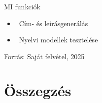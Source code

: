 \documentclass[11pt]{beamer}
\begin{document}
\begin{frame}{MI funkciók}
    \begin{center}
    \end{center}
    \begin{itemize}
      \item \faPen~Cím- és leírásgenerálás
      \item \faFlask~Nyelvi modellek tesztelése
    \end{itemize}
    \begin{center}
        \scriptsize Forrás: Saját felvétel, 2025
    \end{center}
\end{frame}

\section{Összegzés}
\end{document}
